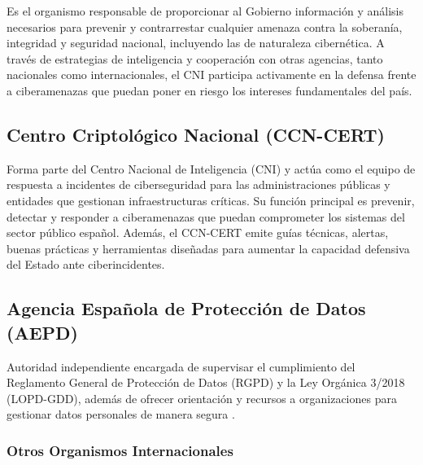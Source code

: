 \documentclass[a4paper, 11pt]{article}
\begin{document}
Es el organismo responsable de proporcionar al Gobierno información y análisis necesarios para prevenir y contrarrestar cualquier amenaza contra la soberanía, integridad y seguridad nacional, incluyendo las de naturaleza cibernética. A través de estrategias de inteligencia y cooperación con otras agencias, tanto nacionales como internacionales, el CNI participa activamente en la defensa frente a ciberamenazas que puedan poner en riesgo los intereses fundamentales del país. \cite{cni}
\par\vspace{0.5cm}

\subsection*{Centro Criptológico Nacional (CCN-CERT)}

Forma parte del Centro Nacional de Inteligencia (CNI) y actúa como el equipo de respuesta a incidentes de ciberseguridad para las administraciones públicas y entidades que gestionan infraestructuras críticas. Su función principal es prevenir, detectar y responder a ciberamenazas que puedan comprometer los sistemas del sector público español. Además, el CCN-CERT emite guías técnicas, alertas, buenas prácticas y herramientas diseñadas para aumentar la capacidad defensiva del Estado ante ciberincidentes. \cite{ccncert}



\par\vspace{0.5cm}

\subsection*{Agencia Española de Protección de Datos (AEPD)}

Autoridad independiente encargada de supervisar el cumplimiento del Reglamento General de Protección de Datos (RGPD) y la Ley Orgánica 3/2018 (LOPD-GDD), además de ofrecer orientación y recursos a organizaciones para gestionar datos personales de manera segura \cite{aepd}.
\par\vspace{0.5cm}


\subsubsection{Otros Organismos Internacionales}

\par\vspace{0.5cm}
\end{document}
